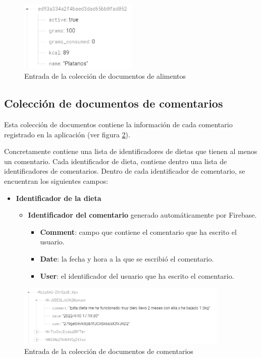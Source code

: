 \begin{figure}[H]
    \centering
    \includegraphics[width=0.5\textwidth]{Images/Capitulo5/alimentsTable.png}
    \caption{Entrada de la colección de documentos de alimentos}
    \label{fig:tabla_aliments}
\end{figure}



\subsection{Colección de documentos de comentarios}
Esta colección de documentos contiene la información de cada comentario registrado en la aplicación (ver figura \ref{fig:tabla_comentarios}).

Concretamente contiene una lista de identificadores de dietas que tienen al menos un comentario.
Cada identificador de dieta, contiene dentro una lista de identificadores de comentarios. Dentro de cada identificador de comentario, se encuentran los siguientes campos:

\begin{itemize}
\item \textbf{Identificador de la dieta}
    \begin{itemize}
        \item \textbf{Identificador del comentario} generado automáticamente por Firebase.
        \begin{itemize}
            \item \textbf{Comment}: campo que contiene el comentario que ha escrito el usuario.
            \item \textbf{Date}: la fecha y hora a la que se escribió el comentario.
            \item \textbf{User}: el identificador del usuario que ha escrito el comentario.
        \end{itemize}
    \end{itemize}
\end{itemize}

\begin{figure}[H]
    \centering
    \includegraphics[width=0.9\textwidth]{Images/Capitulo5/tabla_comentarios.png}
    \caption{Entrada de la colección de documentos de comentarios}
    \label{fig:tabla_comentarios}
\end{figure}




